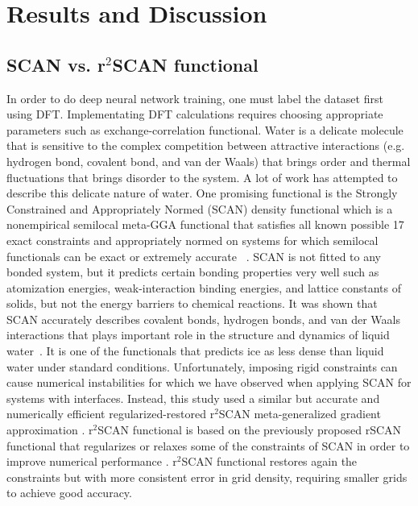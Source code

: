 \chapter{Results and Discussion}

\section{SCAN vs. r$^2$SCAN functional}
In order to do deep neural network training, one must label the dataset first
using
DFT. Implementating DFT calculations requires choosing appropriate parameters
such as exchange-correlation functional. Water is a delicate molecule that is
sensitive to the  complex competition between attractive interactions (e.g.
hydrogen bond, covalent bond, and van der Waals) that brings order and thermal
fluctuations that brings disorder to the system. A lot of work has attempted to
describe this delicate nature of water. One promising functional is the
Strongly Constrained and Appropriately Normed (SCAN)  density
functional
which is  a nonempirical semilocal meta-GGA functional that satisfies
all
known possible 17 exact constraints and  appropriately normed on systems for
which semilocal functionals can be exact or extremely accurate
~\cite{sun2015strongly}.  SCAN is not fitted to any bonded system, but it
predicts certain bonding properties very well such as  atomization
energies, weak-interaction binding energies, and lattice
constants of solids, but not the energy barriers to chemical
reactions. It was shown that SCAN accurately describes covalent bonds, hydrogen
bonds, and van der Waals interactions that plays important role in the
structure and dynamics of liquid water~\cite{chen2017ab}. It is one of the
functionals that predicts ice as less dense than liquid water under standard
conditions. Unfortunately,
imposing rigid constraints can cause numerical instabilities for which we have
observed when applying SCAN for systems with interfaces. Instead, this study
used a similar but accurate and numerically efficient regularized-restored
r$^2$SCAN
meta-generalized gradient
approximation \cite{Furness2020}. r$^2$SCAN functional is based on the
previously proposed rSCAN functional that regularizes or relaxes some of the
constraints of SCAN in order to improve
numerical performance \cite{bartok2019}. r$^2$SCAN functional restores again
the constraints but with more consistent error in grid density,
requiring smaller
grids to
achieve good accuracy.

